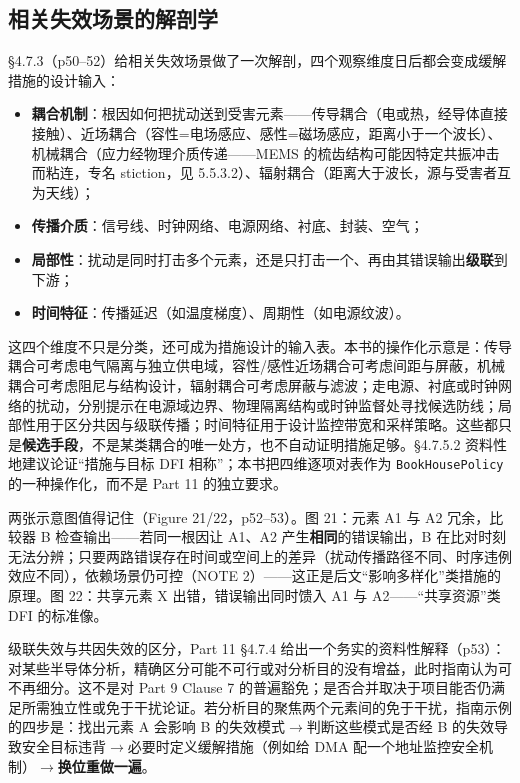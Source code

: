 \subsection{相关失效场景的解剖学}

§4.7.3（p50–52）给相关失效场景做了一次解剖，四个观察维度日后都会变成缓解措施的设计输入：

\begin{itemize}
\item \textbf{耦合机制}：根因如何把扰动送到受害元素——传导耦合（电或热，经导体直接接触）、近场耦合（容性=电场感应、感性=磁场感应，距离小于一个波长）、机械耦合（应力经物理介质传递——MEMS 的梳齿结构可能因特定共振冲击而粘连，专名 stiction，见 5.5.3.2）、辐射耦合（距离大于波长，源与受害者互为天线）；
\item \textbf{传播介质}：信号线、时钟网络、电源网络、衬底、封装、空气；
\item \textbf{局部性}：扰动是同时打击多个元素，还是只打击一个、再由其错误输出\textbf{级联}到下游；
\item \textbf{时间特征}：传播延迟（如温度梯度）、周期性（如电源纹波）。
\end{itemize}

这四个维度不只是分类，还可成为措施设计的输入表。本书的操作化示意是：传导耦合可考虑电气隔离与独立供电域，容性/感性近场耦合可考虑间距与屏蔽，机械耦合可考虑阻尼与结构设计，辐射耦合可考虑屏蔽与滤波；走电源、衬底或时钟网络的扰动，分别提示在电源域边界、物理隔离结构或时钟监督处寻找候选防线；局部性用于区分共因与级联传播；时间特征用于设计监控带宽和采样策略。这些都只是\textbf{候选手段}，不是某类耦合的唯一处方，也不自动证明措施足够。§4.7.5.2 资料性地建议论证“措施与目标 DFI 相称”；本书把四维逐项对表作为 \nolinkurl{BookHousePolicy} 的一种操作化，而不是 Part 11 的独立要求。

两张示意图值得记住（Figure 21/22，p52–53）。图 21：元素 A1 与 A2 冗余，比较器 B 检查输出——若同一根因让 A1、A2 产生\textbf{相同}的错误输出，B 在比对时刻无法分辨；只要两路错误存在时间或空间上的差异（扰动传播路径不同、时序违例效应不同），依赖场景仍可控（NOTE 2）——这正是后文“影响多样化”类措施的原理。图 22：共享元素 X 出错，错误输出同时馈入 A1 与 A2——“共享资源”类 DFI 的标准像。

级联失效与共因失效的区分，Part 11 §4.7.4 给出一个务实的资料性解释（p53）：对某些半导体分析，精确区分可能不可行或对分析目的没有增益，此时指南认为可不再细分。这不是对 Part 9 Clause 7 的普遍豁免；是否合并取决于项目能否仍满足所需独立性或免于干扰论证。若分析目的聚焦两个元素间的免于干扰，指南示例的四步是：找出元素 A 会影响 B 的失效模式\(\rightarrow\)判断这些模式是否经 B 的失效导致安全目标违背\(\rightarrow\)必要时定义缓解措施（例如给 DMA 配一个地址监控安全机制）\(\rightarrow\)\textbf{换位重做一遍}。

